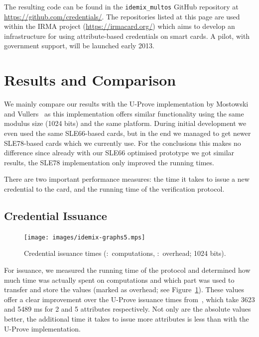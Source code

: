 The resulting code can be found in the \verb!idemix_multos! GitHub repository at
\url{https://github.com/credentials/}. The repositories listed at this page are
used within the IRMA project (\url{https://irmacard.org/}) which aims to develop
an infrastructure for using attribute-based credentials on smart cards. A pilot,
with government support, will be launched early 2013.

\section{Results and Comparison}

We mainly compare our results with the U-Prove implementation by Mostowski and
Vullers~\cite{MostowskiVullers11} as this implementation offers similar
functionality using the same modulus size (1024 bits) and the same platform.
During initial development we even used the same SLE66-based cards, but in the
end we managed to get newer SLE78-based cards which we currently use. For the
conclusions this makes no difference since already with our SLE66 optimised
prototype we got similar results, the SLE78 implementation only improved the
running times.

There are two important performance measures: the time it takes to issue a new
credential to the card, and the running time of the verification protocol.

\subsection{Credential Issuance}

\begin{figure}[b]
  \centering
  \texttt{[image: images/idemix-graphs5.mps]}

  \caption[Credential issuance times.]{
    Credential issuance times
    (:~computations,
      :~overhead; 1024 bits).}
  \label{fig:issuance}
\end{figure}

For issuance, we measured the running time of the protocol and determined how
much time was actually spent on computations and which part was used to transfer
and store the values (marked as overhead; see Figure~\ref{fig:issuance}). These
values offer a clear improvement over the U-Prove issuance times
from~\cite{MostowskiVullers11}, which take 3623 and 5489 ms for 2 and 5
attributes respectively. Not only are the absolute values better, the additional
time it takes to issue more attributes is less than with the U-Prove
implementation.


